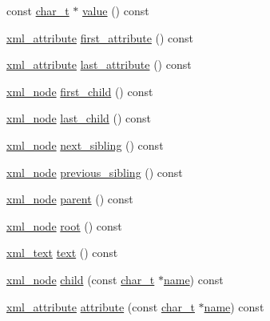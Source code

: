 \begin{DoxyCompactItemize}
\item 
const \hyperlink{namespacepugi_aef5a7a62cba0507542220ea15afe39df}{char\-\_\-t} $\ast$ \hyperlink{classpugi_1_1xml__node_a3e7e935a101432fd4f6dcaf6bfb495d4}{value} () const 
\item 
\hyperlink{classpugi_1_1xml__attribute}{xml\-\_\-attribute} \hyperlink{classpugi_1_1xml__node_ac53e177390f1f73e6cef4f5be3ecaa9d}{first\-\_\-attribute} () const 
\item 
\hyperlink{classpugi_1_1xml__attribute}{xml\-\_\-attribute} \hyperlink{classpugi_1_1xml__node_a10695e006b24e726ba313d5554086802}{last\-\_\-attribute} () const 
\item 
\hyperlink{classpugi_1_1xml__node}{xml\-\_\-node} \hyperlink{classpugi_1_1xml__node_a71641cb34be57df1b25e2df7eac31f00}{first\-\_\-child} () const 
\item 
\hyperlink{classpugi_1_1xml__node}{xml\-\_\-node} \hyperlink{classpugi_1_1xml__node_a076b2868a97458d5abeeec9e6c433244}{last\-\_\-child} () const 
\item 
\hyperlink{classpugi_1_1xml__node}{xml\-\_\-node} \hyperlink{classpugi_1_1xml__node_a713159ab981fb3f0a325434106dc94f5}{next\-\_\-sibling} () const 
\item 
\hyperlink{classpugi_1_1xml__node}{xml\-\_\-node} \hyperlink{classpugi_1_1xml__node_a367e7e2c78a3870aad7ad3831da7c0fa}{previous\-\_\-sibling} () const 
\item 
\hyperlink{classpugi_1_1xml__node}{xml\-\_\-node} \hyperlink{classpugi_1_1xml__node_a5c7a1b2ec89d59afa1028e9c5fc25640}{parent} () const 
\item 
\hyperlink{classpugi_1_1xml__node}{xml\-\_\-node} \hyperlink{classpugi_1_1xml__node_a713b60fd5cddd5d8671dd76b1457e6eb}{root} () const 
\item 
\hyperlink{classpugi_1_1xml__text}{xml\-\_\-text} \hyperlink{classpugi_1_1xml__node_aafe1c1c7cd27f3c9c758b517abc7886a}{text} () const 
\item 
\hyperlink{classpugi_1_1xml__node}{xml\-\_\-node} \hyperlink{classpugi_1_1xml__node_af3aa192b114a289640110c9e4da020ca}{child} (const \hyperlink{namespacepugi_aef5a7a62cba0507542220ea15afe39df}{char\-\_\-t} $\ast$\hyperlink{classpugi_1_1xml__node_ac765caace42ecf252d90aea81e09df57}{name}) const 
\item 
\hyperlink{classpugi_1_1xml__attribute}{xml\-\_\-attribute} \hyperlink{classpugi_1_1xml__node_a19fc1a285c0f751f52c0e151a727de97}{attribute} (const \hyperlink{namespacepugi_aef5a7a62cba0507542220ea15afe39df}{char\-\_\-t} $\ast$\hyperlink{classpugi_1_1xml__node_ac765caace42ecf252d90aea81e09df57}{name}) const 

\end{DoxyCompactItemize}
